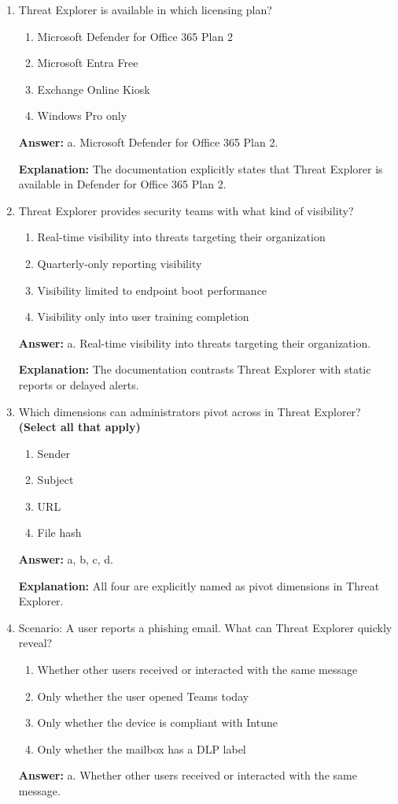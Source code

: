 \documentclass[10pt]{article}
\begin{document}
\begin{enumerate}[leftmargin=*]
\item Threat Explorer is available in which licensing plan?
\begin{enumerate}[label=\alph*., leftmargin=1.5em]
\item Microsoft Defender for Office 365 Plan 2
\item Microsoft Entra Free
\item Exchange Online Kiosk
\item Windows Pro only
\end{enumerate}
\textbf{Answer:} a. Microsoft Defender for Office 365 Plan 2.

\textbf{Explanation:} The documentation explicitly states that Threat Explorer is available in Defender for Office 365 Plan 2.

\item Threat Explorer provides security teams with what kind of visibility?
\begin{enumerate}[label=\alph*., leftmargin=1.5em]
\item Real-time visibility into threats targeting their organization
\item Quarterly-only reporting visibility
\item Visibility limited to endpoint boot performance
\item Visibility only into user training completion
\end{enumerate}
\textbf{Answer:} a. Real-time visibility into threats targeting their organization.

\textbf{Explanation:} The documentation contrasts Threat Explorer with static reports or delayed alerts.

\item Which dimensions can administrators pivot across in Threat Explorer? \textbf{(Select all that apply)}
\begin{enumerate}[label=\alph*., leftmargin=1.5em]
\item Sender
\item Subject
\item URL
\item File hash
\end{enumerate}
\textbf{Answer:} a, b, c, d.

\textbf{Explanation:} All four are explicitly named as pivot dimensions in Threat Explorer.

\item Scenario: A user reports a phishing email. What can Threat Explorer quickly reveal?
\begin{enumerate}[label=\alph*., leftmargin=1.5em]
\item Whether other users received or interacted with the same message
\item Only whether the user opened Teams today
\item Only whether the device is compliant with Intune
\item Only whether the mailbox has a DLP label
\end{enumerate}
\textbf{Answer:} a. Whether other users received or interacted with the same message.


\end{enumerate}
\end{document}
